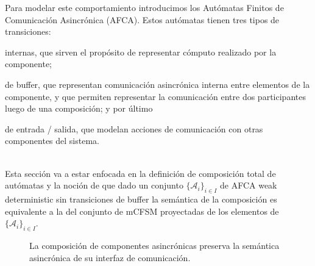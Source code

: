 Para modelar este comportamiento introducimos los Autómatas Finitos de Comunicación Asincrónica (AFCA). Estos autómatas tienen tres tipos de transiciones: 
\begin{inparaenum}[1)]
\item internas, que sirven el propósito de representar cómputo realizado por la componente; 
\item de buffer, que representan comunicación asincrónica interna entre elementos de la componente, y que permiten representar la comunicación entre dos participantes luego de una composición; y por último 
\item de entrada / salida, que modelan acciones de comunicación con otras componentes del sistema.
\end{inparaenum} \\
Esta sección va a estar enfocada en la definición de composición total de autómatas y la noción de que dado un conjunto $\{ \mathcal{A}_i\}_{i \in I}$ de AFCA weak deterministic sin transiciones de buffer la semántica de la composición es equivalente a la del conjunto de mCFSM proyectadas de los elementos de $\{ \mathcal{A}_i\}_{i \in I}$. 

\begin{figure}[ht]
\caption{La composición de componentes asincrónicas preserva la semántica asincrónica de su interfaz de comunicación.}
\label{fig:preservacion}
\end{figure}

